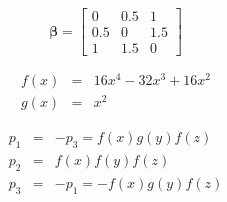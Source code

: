 \documentclass[12pt,twoside,a4paper]{article}
\begin{document}
\begin{equation}
\boldsymbol{\beta} = 
\begin{bmatrix}
    0       & 0.5 & 1  \\
    0.5     & 0   & 1.5  \\
    1       & 1.5 & 0 
\end{bmatrix}
\end{equation}

\begin{eqnarray}
f(x) &=& 16x^4 - 32x^3 + 16x^2 \\
g(x) &=& x^2
\end{eqnarray}

\begin{eqnarray}
p_1 &=& -p_3 = f(x)g(y)f(z) \\
p_2	&=& f(x)f(y)f(z)\\
p_3	&=& -p_1 = -f(x)g(y)f(z)
\end{eqnarray}
\end{document}
